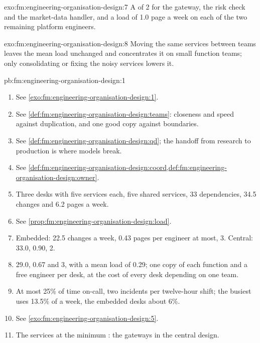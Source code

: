 \begin{solution}{exo:fm:engineering-organisation-design:7}
A  of 2 for the gateway, the risk check and the market-data handler, and a load of 1.0 page a week on each of the two remaining platform
engineers.
\end{solution}

\begin{solution}{exo:fm:engineering-organisation-design:8}
Moving the same services between teams leaves the mean load unchanged and concentrates it on small function teams; only consolidating or
fixing the noisy services lowers it.
\end{solution}

\begin{solution}{pb:fm:engineering-organisation-design:1}
\begin{enumerate}
\item See \cref{exo:fm:engineering-organisation-design:1}.
\item See \cref{def:fm:engineering-organisation-design:teams}: closeness and speed against duplication, and one good copy against boundaries.
\item See \cref{def:fm:engineering-organisation-design:qd}; the handoff from research to production is where models break.
\item See \cref{def:fm:engineering-organisation-design:coord,def:fm:engineering-organisation-design:owner}.
\item Three desks with five services each, five shared services, 33 dependencies, 34.5 changes and 6.2 pages a week.
\item See \cref{prop:fm:engineering-organisation-design:load}.
\item Embedded: 22.5 changes a week, 0.43 pages per engineer at most,  3. Central: 33.0, 0.90, 2.
\item 29.0, 0.67 and 3, with a mean load of 0.29; one copy of each function and a free engineer per desk, at the cost of every desk depending on one
team.
\item At most 25\% of time on-call, two incidents per twelve-hour shift; the busiest  uses 13.5\% of a week, the embedded desks about
6\%.
\item See \cref{exo:fm:engineering-organisation-design:5}.
\item The services at the minimum : the gateways in the central design.

\end{enumerate}
\end{solution}
